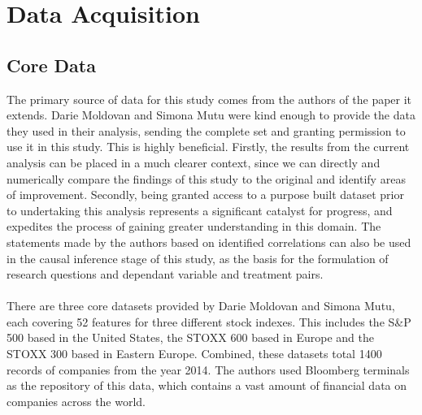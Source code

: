 \section{Data Acquisition}
\subsection{Core Data}
{The primary source of data for this study comes from the authors of the paper it extends. Darie Moldovan and Simona Mutu were kind enough to provide the data they used in their analysis, sending the complete set and granting permission to use it in this study. This is highly beneficial. Firstly, the results from the current analysis can be placed in a much clearer context, since we can directly and numerically compare the findings of this study to the original and identify areas of improvement. Secondly, being granted access to a purpose built dataset prior to undertaking this analysis represents a significant catalyst for progress, and expedites the process of gaining greater understanding in this domain. The statements made by the authors based on identified correlations can also be used in the causal inference stage of this study, as the basis for the formulation of research questions and dependant variable and treatment pairs.}\\\\
{There are three core datasets provided by Darie Moldovan and Simona Mutu, each covering 52 features for three different stock indexes. This includes the S\&P 500 based in the United States, the STOXX 600 based in Europe and the STOXX 300 based in Eastern Europe. Combined, these datasets total 1400 records of companies from the year 2014. The authors used Bloomberg terminals as the repository of this data, which contains a vast amount of financial data on companies across the world.}
